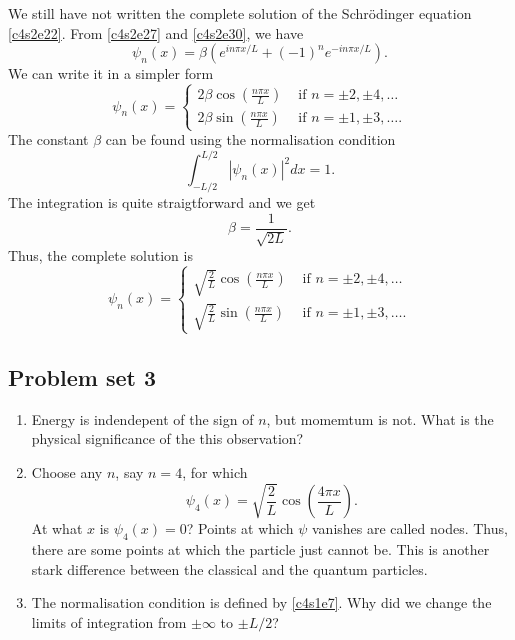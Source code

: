 We still have not written the complete solution of the Schr\"{o}dinger equation
\eqref{c4s2e22}. From \eqref{c4s2e27} and \eqref{c4s2e30}, we have
\begin{equation}\label{c4s2e34}
\psi_n(x) = \beta(e^{in\pi x/L} + (-1)^n e^{-in\pi x/L}).
\end{equation} 
We can write it in a simpler form
\begin{equation}\label{c4s2e35}
\psi_n(x) = \begin{cases}
2\beta\cos\left(\frac{n\pi x}{L}\right) & \text{ if } n = \pm 2, \pm 4, \ldots\\
2\beta\sin\left(\frac{n\pi x}{L}\right) & \text{ if } n = \pm 1, \pm 3, \ldots.
\end{cases}
\end{equation}
The constant $\beta$ can be found using the normalisation condition
\begin{equation}\label{c4s2e36}
\int_{-L/2}^{L/2} |\psi_n(x)|^2dx = 1.
\end{equation}
The integration is quite straigtforward and we get
\begin{equation}\label{c4s2e37}
\beta = \frac{1}{\sqrt{2L}}.
\end{equation}
Thus, the complete solution is
\begin{equation}\label{c4s2e38}
\psi_n(x) = \begin{cases}
\sqrt{\frac{2}{L}}\cos\left(\frac{n\pi x}{L}\right) & 
   \text{ if } n = \pm 2, \pm 4, \ldots \\
\sqrt{\frac{2}{L}}\sin\left(\frac{n\pi x}{L}\right) & 
   \text{ if } n = \pm 1, \pm 3, \ldots.
\end{cases}
\end{equation}

\subsection{Problem set 3}
\begin{enumerate}
\item Energy is indendepent of the sign of $n$, but momemtum is not. What is 
the physical significance of the this observation?
\item Choose any $n$, say $n = 4$, for which
\[
\psi_4(x) = \sqrt{\frac{2}{L}}\cos\left(\frac{4\pi x}{L}\right).
\]
At what $x$ is $\psi_4(x) = 0$? Points at which $\psi$ vanishes are called 
nodes.  Thus, there are some points at which the particle just cannot be. This 
is another stark difference between the classical and the quantum particles.
\item The normalisation condition is defined by \eqref{c4s1e7}. Why did we 
change the limits of integration from $\pm\infty$ to $\pm L/2$?
\end{enumerate}

